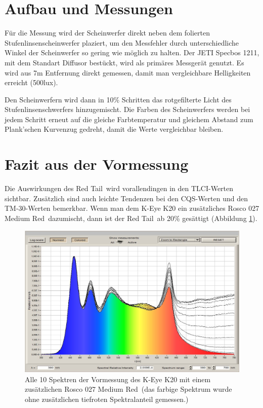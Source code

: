 \section{Aufbau und Messungen}
\label{sec_vmaum}

Für die Messung wird der Scheinwerfer direkt neben dem folierten Stufenlinsenscheinwerfer plaziert, um den Messfehler durch unterschiedliche Winkel der Scheinwerfer so gering wie möglich zu halten. Der JETI Specbos 1211, mit dem Standart Diffusor bestückt, wird als primäres Messgerät genutzt. Es wird aus 7m Entfernung direkt gemessen, damit man vergleichbare Helligkeiten erreicht (500lux). 

Den Scheinwerfern wird dann in 10\% Schritten das rotgefilterte Licht des Stufenlinsenschwerfers hinzugemischt. Die Farben des Scheinwerfers werden bei jedem Schritt erneut auf die gleiche Farbtemperatur und gleichem Abstand zum Plank'schen Kurvenzug gedreht, damit die Werte vergleichbar bleiben.


\section{Fazit aus der Vormessung}
\label{sec_vmfazit}
Die Auswirkungen des \glqq Red Tail\grqq\ wird vorallendingen in den TLCI-Werten sichtbar. Zusätzlich sind auch leichte Tendenzen bei den CQS-Werten und den TM-30-Werten bemerkbar.
Wenn man dem K-Eye K20 ein zusätzliches Rosco 027 \glqq Medium Red\grqq\ dazumischt, dann ist der \glqq Red Tail\grqq\ ab 20\% gesättigt (Abbildung \ref{b_keyevor1}). 

\begin{figure}[H]     %
\centering
\includegraphics[width=1.0\textwidth]{bilder/keyevor1} 
\caption {Alle 10 Spektren der Vormessung des K-Eye K20 mit einem zusätzlichen  Rosco 027 \glqq Medium Red\grqq\ (das farbige Spektrum wurde ohne zusätzlichen tiefroten Spektralanteil gemessen.)}\label{b_keyevor1}
\end{figure}

